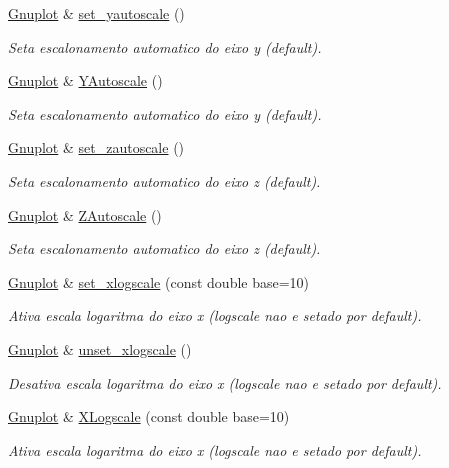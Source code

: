 \begin{DoxyCompactItemize}
\hyperlink{class_gnuplot}{Gnuplot} \& \hyperlink{class_gnuplot_a3cc19dba32bb2d3ac59494ae1493faa7}{set\+\_\+yautoscale} ()
\begin{DoxyCompactList}\small\item\em Seta escalonamento automatico do eixo y (default). \end{DoxyCompactList}\item 
\hyperlink{class_gnuplot}{Gnuplot} \& \hyperlink{class_gnuplot_a288c0be86e20ff6986f5b43cb69b2bb0}{Y\+Autoscale} ()
\begin{DoxyCompactList}\small\item\em Seta escalonamento automatico do eixo y (default). \end{DoxyCompactList}\item 
\hyperlink{class_gnuplot}{Gnuplot} \& \hyperlink{class_gnuplot_ad72aa208fad039b6b7d13ea9595ce157}{set\+\_\+zautoscale} ()
\begin{DoxyCompactList}\small\item\em Seta escalonamento automatico do eixo z (default). \end{DoxyCompactList}\item 
\hyperlink{class_gnuplot}{Gnuplot} \& \hyperlink{class_gnuplot_ac926d0513fa38b316be4c6acfc65ca80}{Z\+Autoscale} ()
\begin{DoxyCompactList}\small\item\em Seta escalonamento automatico do eixo z (default). \end{DoxyCompactList}\item 
\hyperlink{class_gnuplot}{Gnuplot} \& \hyperlink{class_gnuplot_aff546fad227d93babeb5d2cc9f047b89}{set\+\_\+xlogscale} (const double base=10)
\begin{DoxyCompactList}\small\item\em Ativa escala logaritma do eixo x (logscale nao e setado por default). \end{DoxyCompactList}\item 
\hyperlink{class_gnuplot}{Gnuplot} \& \hyperlink{class_gnuplot_aed8f962539fd8f53ab2c0218da7a6010}{unset\+\_\+xlogscale} ()
\begin{DoxyCompactList}\small\item\em Desativa escala logaritma do eixo x (logscale nao e setado por default). \end{DoxyCompactList}\item 
\hyperlink{class_gnuplot}{Gnuplot} \& \hyperlink{class_gnuplot_a16763e22005b72ebe62c09653b2dc8fa}{X\+Logscale} (const double base=10)
\begin{DoxyCompactList}\small\item\em Ativa escala logaritma do eixo x (logscale nao e setado por default). \end{DoxyCompactList}\item 

\end{DoxyCompactItemize}
